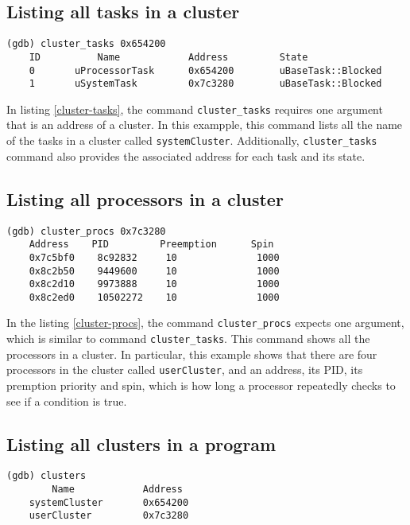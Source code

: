 \subsection{Listing all tasks in a cluster}
\begin{lstlisting}[caption={\text{cluster\_tasks} command}, label={cluster-tasks}]
(gdb) cluster_tasks 0x654200
    ID          Name            Address         State
    0       uProcessorTask      0x654200        uBaseTask::Blocked
    1       uSystemTask         0x7c3280        uBaseTask::Blocked
\end{lstlisting}
In listing \ref{cluster-tasks}, the command \verb|cluster_tasks| requires one
argument that is an address of a cluster. In this exampple, this command lists
all the name of the tasks in a cluster called \verb|systemCluster|.
Additionally, \verb|cluster_tasks| command also provides the associated address
for each task and its state.

\subsection{Listing all processors in a cluster}
\begin{lstlisting}[caption={\text{cluster\_procs} command}, label={cluster-procs}]
(gdb) cluster_procs 0x7c3280
    Address    PID         Preemption      Spin
    0x7c5bf0    8c92832     10              1000
    0x8c2b50    9449600     10              1000
    0x8c2d10    9973888     10              1000
    0x8c2ed0    10502272    10              1000
\end{lstlisting}
In the listing \ref{cluster-procs}, the command \verb|cluster_procs| expects one
argument, which is similar to command \verb|cluster_tasks|. This command shows
all the processors in a cluster. In particular, this example shows that there
are four processors in the cluster called \verb|userCluster|, and an address,
its PID, its premption priority and spin, which is how long a processor
repeatedly checks to see if a condition is true.
\subsection{Listing all clusters in a \uCPPS program}

\begin{lstlisting}[caption={clusters command}]
(gdb) clusters
        Name            Address
    systemCluster       0x654200
    userCluster         0x7c3280
\end{lstlisting}

